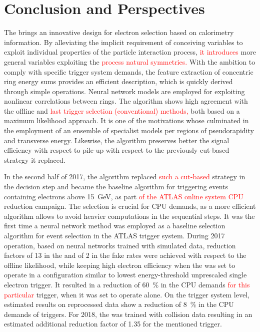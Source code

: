 \section{Conclusion and Perspectives}\label{sec:conclusion}






The \rnn{} brings an innovative design for electron selection based on
calorimetry information. By alleviating the implicit requirement of conceiving
variables to exploit individual properties of the particle interaction process, \textcolor{red}{it introduces} 
more general variables exploiting the \textcolor{red}{process natural symmetries.} With the
ambition to comply with specific trigger system demands, the feature extraction
of concentric ring energy sums provides an efficient description, which is quickly derived
through simple operations. Neural network models are employed for exploiting
nonlinear correlations between rings. The algorithm shows
high agreement with the offline and \textcolor{red}{last trigger selection (conventional) methods,} both based
on a maximum likelihood approach. It is one of the motivations whose culminated
in the employment of an ensemble of specialist models per regions of
pseudorapidity and transverse energy. Likewise, the \rnn{} algorithm preserves
better the signal efficiency with respect to pile-up with respect to the
previously cut-based strategy it replaced.



In the second half of 2017, the \rnn{} algorithm replaced \textcolor{red}{such a cut-based} strategy
in the \fastcalo{} decision step and became the baseline algorithm
for triggering events containing electrons above \SI{15}{\GeV}, as part \textcolor{red}{of the ATLAS online system CPU} reduction campaign. The \fastcalo{} selection is crucial for CPU demands, as a more
efficient algorithm allows to avoid heavier computations in the
sequential steps.  It was the first time a neural network method was employed as
a baseline selection algorithm for event selection in the ATLAS trigger system.
During 2017 operation, based on neural networks trained with simulated data,
reduction factors of 13 in the \fastcalo{} and of 2 in
the \hlt{} fake rates were achieved with respect to the offline likelihood, while
keeping high electron efficiency when the \rnn{} was set to operate in a
configuration similar to lowest energy-threshold unprescaled single electron
trigger. It resulted in a reduction of \SI{60}{\%} in the CPU demands \textcolor{red}{for this particular} trigger, when it was set to operate alone. On the trigger system level,
estimated results on reprocessed data show a reduction of \SI{8}{\%} in the CPU
demands of \egamma{} triggers. For 2018, the \rnn{} was trained with collision
data resulting in an estimated additional reduction factor of 1.35 for the
mentioned trigger.

